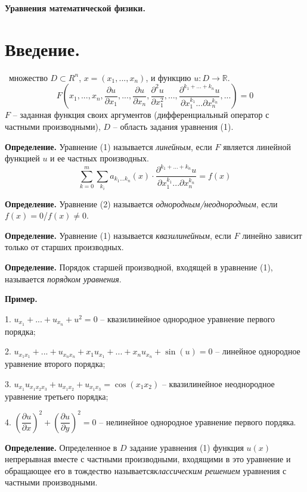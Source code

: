 \documentclass[9pt]{article}
\begin{document}
\begin{center}
    \huge\textbf{Уравнения математической физики.}
\end{center}

\section{Введение.}

\par\ 
 множество \(D \subset R^n\), \(x = (x_1,...,x_n)\), и функцию \(u:D\to\mathbb R\).
\begin{equation}
F(x_1,...,x_n,\dfrac{\partial u}{\partial x_1},...,\dfrac{\partial u}{\partial x_n},\dfrac{\partial^2 u}{\partial x_1^2},...,\dfrac{\partial^{k_1+...+k_n} u}{\partial x_1^{k_1}...\partial x_n^{k_n}},...) = 0
\end{equation}\(F\) -- заданная функция своих аргументов (дифференциальный оператор с частными производными), \(D\) -- область задания уравнения (1).
\par\textbf{Определение.} Уравнение (1) называется \textit{линейным}, если \(F\) является линейной функцией \(u\) и ее частных производных.
\begin{equation}
\sum^m_{k=0}\sum_{k_i}a_{k_1...k_n}(x)\cdot\dfrac{\partial^{k_1+...+k_n}u}{\partial x_1^{k_1}...\partial x_n^{k_n}} = f(x)
\end{equation}
\par\textbf{Определение.} Уравнение (2) называется \textit{однородным/неоднородным}, если \(f(x)=0\)/\(f(x)\neq0\).
\par\textbf{Определение.} Уравнение (1) называется \textit{квазилинейным}, если \(F\) линейно зависит только от старших производных.
\par\textbf{Определение.} Порядок старшей производной, входящей в уравнение (1), называется \textit{порядком уравнения}.
\par\textbf{Пример.}
\par1. \(u_{x_1}+...+u_{x_n}+u^2=0\) -- квазилинейное однородное уравнение первого порядка;
\par2. \(u_{x_1x_1}+...+u_{x_nx_n}+x_1u_{x_1}+...+x_nu_{x_n}+\sin(u)=0\) -- линейное однородное уравнение второго порядка;
\par3. \(u_{x_1}u_{x_1x_2x_3}+u_{x_1x_2}+u_{x_1x_3}=\cos(x_1x_2)\) -- квазилинейное неоднородное уравнение третьего порядка;
\par4. \(\left(\dfrac{\partial u}{\partial x}\right)^2+\left(\dfrac{\partial u}{\partial y}\right)^2=0\) -- нелинейное однородное уравнение первого пордяка.
\par\textbf{Определение.} Определенное в \(D\) задание уравнения (1) функция \(u(x)\) непрерывная вместе с частными производными, входящими в это уравнение и обращающее его в тождество называется\textit{классическим решением} уравнения с частными производными.
\end{document}
